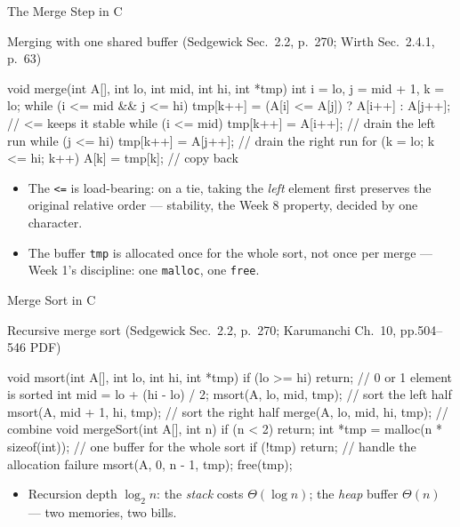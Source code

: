 \documentclass[aspectratio=169]{beamer}
\begin{document}
\begin{frame}[fragile]{The Merge Step in C}
  \footnotesize
  \begin{block}{Merging with one shared buffer (Sedgewick Sec.~2.2, p.~270;
    Wirth Sec.~2.4.1, p.~63)
    \cite{Sedgewick2011_algorithms,Wirth2004_algorithms_data_structures}}
\begin{semiverbatim}
void merge(int A[], int lo, int mid, int hi, int *tmp) {
  int i = lo, j = mid + 1, k = lo;
  while (i <= mid && j <= hi)
    tmp[k++] = (A[i] <= A[j]) ? A[i++] : A[j++];  // <= keeps it stable
  while (i <= mid) tmp[k++] = A[i++];             // drain the left run
  while (j <= hi)  tmp[k++] = A[j++];             // drain the right run
  for (k = lo; k <= hi; k++) A[k] = tmp[k];       // copy back
}
\end{semiverbatim}
  \end{block}
  \begin{itemize}
    \item The \texttt{<=} is load-bearing: on a tie, taking the \emph{left}
      element first preserves the original relative order --- stability, the
      Week 8 property, decided by one character.
    \item The buffer \texttt{tmp} is allocated once for the whole sort, not
      once per merge --- Week 1's discipline: one \texttt{malloc}, one
      \texttt{free}.
  \end{itemize}
\end{frame}

\begin{frame}[fragile]{Merge Sort in C}
  \scriptsize
  \begin{block}{Recursive merge sort (Sedgewick Sec.~2.2, p.~270; Karumanchi
    Ch.~10, pp.504--546 PDF)
    \cite{Sedgewick2011_algorithms,Karumanchi2017_data_structures_algorithms_made_easy}}
\begin{semiverbatim}
void msort(int A[], int lo, int hi, int *tmp) {
  if (lo >= hi) return;                 // 0 or 1 element is sorted
  int mid = lo + (hi - lo) / 2;
  msort(A, lo, mid, tmp);               // sort the left half
  msort(A, mid + 1, hi, tmp);           // sort the right half
  merge(A, lo, mid, hi, tmp);           // combine
}
void mergeSort(int A[], int n) {
  if (n < 2) return;
  int *tmp = malloc(n * sizeof(int));   // one buffer for the whole sort
  if (!tmp) return;                     // handle the allocation failure
  msort(A, 0, n - 1, tmp);
  free(tmp);
}
\end{semiverbatim}
  \end{block}
  \vspace{-0.25cm}
  \begin{itemize}
    \item Recursion depth $\log_2 n$: the \emph{stack} costs $\Theta(\log n)$;
      the \emph{heap} buffer $\Theta(n)$ --- two memories, two bills.
  \end{itemize}
\end{frame}
\end{document}
